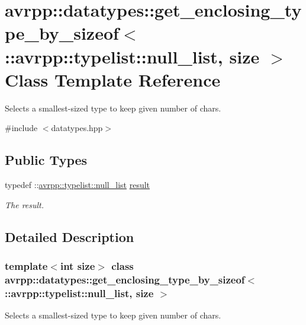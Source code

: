 \hypertarget{classavrpp_1_1datatypes_1_1get__enclosing__type__by__sizeof_3_01_1_1avrpp_1_1typelist_1_1null__list_00_01size_01_4}{
\section{avrpp::datatypes::get\_\-enclosing\_\-type\_\-by\_\-sizeof$<$ ::avrpp::typelist::null\_\-list, size $>$ Class Template Reference}
\label{classavrpp_1_1datatypes_1_1get__enclosing__type__by__sizeof_3_01_1_1avrpp_1_1typelist_1_1null__list_00_01size_01_4}
}


Selects a smallest-\/sized type to keep given number of chars.  




{\ttfamily \#include $<$datatypes.hpp$>$}

\subsection*{Public Types}
\begin{DoxyCompactItemize}
\item 
typedef ::\hyperlink{structavrpp_1_1typelist_1_1null__list}{avrpp::typelist::null\_\-list} \hyperlink{classavrpp_1_1datatypes_1_1get__enclosing__type__by__sizeof_3_01_1_1avrpp_1_1typelist_1_1null__list_00_01size_01_4_a748a419d43056e002fb2463cddfe54b2}{result}
\begin{DoxyCompactList}\small\item\em The result. \item\end{DoxyCompactList}\end{DoxyCompactItemize}


\subsection{Detailed Description}
\subsubsection*{template$<$int size$>$ class avrpp::datatypes::get\_\-enclosing\_\-type\_\-by\_\-sizeof$<$ ::avrpp::typelist::null\_\-list, size $>$}

Selects a smallest-\/sized type to keep given number of chars. 


